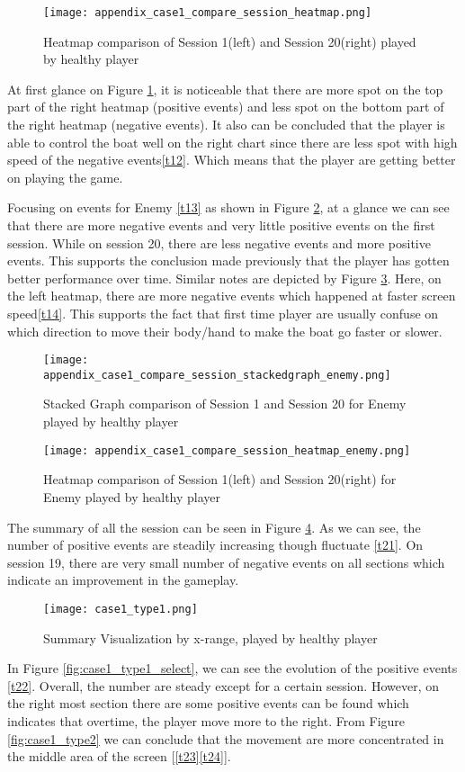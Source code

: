 \begin{figure}[H]
\centering
\texttt{[image: appendix\_case1\_compare\_session\_heatmap.png]}
\caption{Heatmap comparison of Session 1(left) and Session 20(right) played by healthy player}
\label{fig:app1_heatmap}
\end{figure}
At first glance on Figure \ref{fig:app1_heatmap}, it is noticeable that there are more spot on the top part of the right heatmap (positive events) and less spot on the bottom part of the right heatmap (negative events). It also can be concluded that the player is able to control the boat well on the right chart since there are less spot with high speed of the negative events\ref{t12}. Which means that the player are getting better on playing the game. 

Focusing on events for Enemy \ref{t13} as shown in Figure \ref{fig:app1_stacked_enemy}, at a glance we can see that there are more negative events and very little positive events on the first session. While on session 20, there are less negative events and more positive events. This supports the conclusion made previously that the player has gotten better performance over time. Similar notes are depicted by Figure \ref{fig:app1_heatmap_enemy}. Here, on the left heatmap, there are more negative events which happened at faster screen speed\ref{t14}. This supports the fact that first time player are usually confuse on which direction to move their body/hand to make the boat go faster or slower.

\begin{figure}[H]
\centering
\texttt{[image: appendix\_case1\_compare\_session\_stackedgraph\_enemy.png]}
\caption{Stacked Graph comparison of Session 1 and Session 20 for Enemy played by healthy player}
\label{fig:app1_stacked_enemy}
\end{figure}

\begin{figure}[H]
\centering
\texttt{[image: appendix\_case1\_compare\_session\_heatmap\_enemy.png]}
\caption{Heatmap comparison of Session 1(left) and Session 20(right) for Enemy played by healthy player}
\label{fig:app1_heatmap_enemy}
\end{figure}

The summary of all the session can be seen in Figure \ref{fig:case1_type1}. As we can see, the number of positive events are steadily increasing though fluctuate \ref{t21}. On session 19, there are very small number of negative events on all sections which indicate an improvement in the gameplay. 
\begin{figure}[H]
\centering
\texttt{[image: case1\_type1.png]}
\caption{Summary Visualization by x-range, played by healthy player}
\label{fig:case1_type1}
\end{figure}
In Figure \ref{fig:case1_type1_select}, we can see the evolution of the positive events \ref{t22}. Overall, the number are steady except for a certain session. However, on the right most section there are some positive events can be found which indicates that overtime, the player move more to the right. From Figure \ref{fig:case1_type2} we can conclude that the movement are more concentrated in the middle area of the screen [\ref{t23}\ref{t24}].

